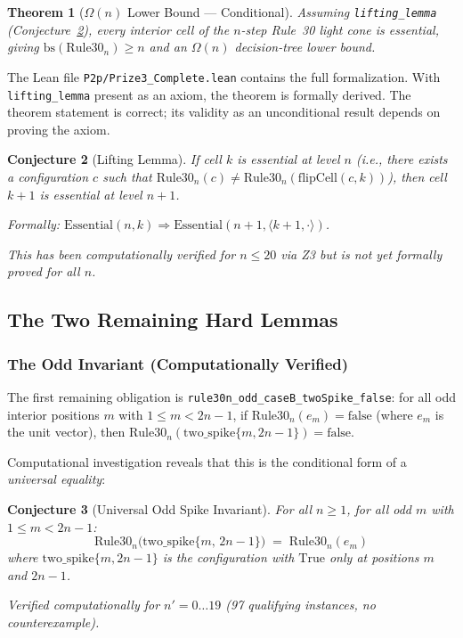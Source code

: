 \documentclass[11pt]{article}
\newtheorem{theorem}{Theorem}
\newtheorem{conjecture}[theorem]{Conjecture}
\begin{document}
\begin{theorem}[$\Omega(n)$ Lower Bound — Conditional]\label{thm:lower}
Assuming \texttt{lifting\_lemma} (Conjecture~\ref{conj:lifting}), every interior cell of the $n$-step Rule~30 light cone is essential, giving $\mathrm{bs}(\mathrm{Rule30}_n) \geq n$ and an $\Omega(n)$ decision-tree lower bound.
\end{theorem}

The Lean file \texttt{P2p/Prize3\_Complete.lean} contains the full formalization. With \texttt{lifting\_lemma} present as an axiom, the theorem is formally derived. The theorem statement is correct; its validity as an unconditional result depends on proving the axiom.

\begin{conjecture}[Lifting Lemma]\label{conj:lifting}
If cell $k$ is essential at level $n$ (i.e., there exists a configuration $c$ such that $\mathrm{Rule30}_n(c) \neq \mathrm{Rule30}_n(\mathrm{flipCell}(c, k))$), then cell $k+1$ is essential at level $n+1$.

Formally: $\mathrm{Essential}(n, k) \Rightarrow \mathrm{Essential}(n+1, \langle k{+}1, \cdot\rangle)$.

This has been computationally verified for $n \leq 20$ via Z3 but is not yet formally proved for all $n$.
\end{conjecture}

\subsection{The Two Remaining Hard Lemmas}

\subsubsection{The Odd Invariant (Computationally Verified)}\label{sec:odd_invariant}

The first remaining obligation is \texttt{rule30n\_odd\_caseB\_twoSpike\_false}: for all odd interior positions $m$ with $1 \leq m < 2n-1$, if $\mathrm{Rule30}_n(e_m) = \mathrm{false}$ (where $e_m$ is the unit vector), then $\mathrm{Rule30}_n(\mathrm{two\_spike}\{m, 2n-1\}) = \mathrm{false}$.

Computational investigation reveals that this is the conditional form of a \emph{universal equality}:

\begin{conjecture}[Universal Odd Spike Invariant]\label{conj:odd_invariant}
For all $n \geq 1$, for all odd $m$ with $1 \leq m < 2n-1$:
\[
  \mathrm{Rule30}_n\bigl(\mathrm{two\_spike}\{m,\, 2n-1\}\bigr) \;=\; \mathrm{Rule30}_n(e_m)
\]
where $\mathrm{two\_spike}\{m, 2n-1\}$ is the configuration with $\mathrm{True}$ only at positions $m$ and $2n-1$.

Verified computationally for $n' = 0 \ldots 19$ (97 qualifying instances, no counterexample).
\end{conjecture}
\end{document}
